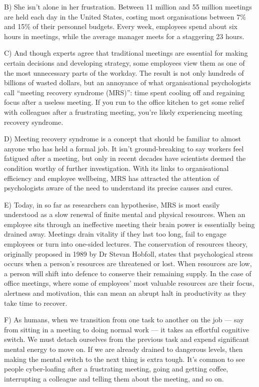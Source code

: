 \documentclass[UTF8,11pt]{ctexart}
\begin{document}
B) She isn’t alone in her frustration. Between 11 million and 55 million meetings are held each day in the United States, costing most organisations between 7\% and 15\% of their personnel budgets. Every week, employees spend about six hours in meetings, while the average manager meets for a staggering 23 hours.


C) And though experts agree that traditional meetings are essential for making certain decisions and developing strategy, some employees view them as one of the most unnecessary parts of the workday. The result is not only hundreds of billions of wasted dollars, but an annoyance of what organisational psychologists call “meeting recovery syndrome (MRS)”: time spent cooling off and regaining focus after a useless meeting. If you run to the office kitchen to get some relief with colleagues after a frustrating meeting, you’re likely experiencing meeting recovery syndrome.


D) Meeting recovery syndrome is a concept that should be familiar to almost anyone who has held a formal job. It isn’t ground-breaking to say workers feel fatigued after a meeting, but only in recent decades have scientists deemed the condition worthy of further investigation. With its links to organisational efficiency and employee wellbeing, MRS has attracted the attention of psychologists aware of the need to understand its precise causes and cures.


E) Today, in so far as researchers can hypothesise, MRS is most easily understood as a slow renewal of finite mental and physical resources. When an employee sits through an ineffective meeting their brain power is essentially being drained away. Meetings drain vitality if they last too long, fail to engage employees or turn into one-sided lectures. The conservation of resources theory, originally proposed in 1989 by Dr Stevan Hobfoll, states that psychological stress occurs when a person’s resources are threatened or lost. When resources are low, a person will shift into defence to conserve their remaining supply. In the case of office meetings, where some of employees’ most valuable resources are their focus, alertness and motivation, this can mean an abrupt halt in productivity as they take time to recover.


F) As humans, when we transition from one task to another on the job — say from sitting in a meeting to doing normal work — it takes an effortful cognitive switch. We must detach ourselves from the previous task and expend significant mental energy to move on. If we are already drained to dangerous levels, then making the mental switch to the next thing is extra tough. It’s common to see people cyber-loafing after a frustrating meeting, going and getting coffee, interrupting a colleague and telling them about the meeting, and so on.
\end{document}
